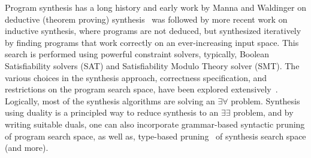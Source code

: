 \documentclass[preprint]{sig-alternate-05-2015}
\begin{document}
Program synthesis has a long history and early work by Manna and Waldinger on
deductive (theorem proving) synthesis~\cite{Manna71} was followed by more recent
work on inductive synthesis, where programs
are not deduced, but synthesized iteratively by finding programs that work correctly on an ever-increasing
input space.  This search is performed using powerful constraint solvers, 
typically, Boolean Satisfiability solvers (SAT) and Satisfiability Modulo Theory solver (SMT).
The various choices in the synthesis approach,
correctness specification, and restrictions on the program search space,
have been explored extensively~\cite{DBLP:conf/fmcad/AlurBJMRSSSTU13,Solar05,Solar06,bitvector,icse10}.
%
Logically, most of the synthesis algorithms are solving
an $\exists\forall$ problem.
Synthesis using duality is a principled way to reduce synthesis to an
$\exists\exists$ problem, and by writing suitable duals, one can also incorporate
grammar-based syntactic pruning of program search space,
as well as, type-based pruning~\cite{DBLP:conf/pldi/OseraZ15} of synthesis search space (and more).
\end{document}
